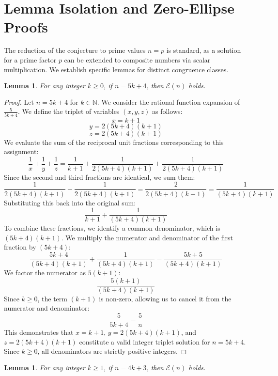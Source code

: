 \documentclass[12pt, a4paper]{article}
\newtheorem{lemma}[theorem]{Lemma}
\begin{document}
\section{Lemma Isolation and Zero-Ellipse Proofs}

The reduction of the conjecture to prime values $n = p$ is standard, as a solution for a prime factor $p$ can be extended to composite numbers via scalar multiplication. We establish specific lemmas for distinct congruence classes.

\begin{lemma}
For any integer $k \ge 0$, if $n = 5k + 4$, then $\mathcal{E}(n)$ holds.
\end{lemma}

\begin{proof}
Let $n = 5k + 4$ for $k \in \mathbb{N}$. We consider the rational function expansion of $\frac{5}{5k+4}$. We define the triplet of variables $(x, y, z)$ as follows:
\[ x = k + 1 \]
\[ y = 2(5k+4)(k+1) \]
\[ z = 2(5k+4)(k+1) \]
We evaluate the sum of the reciprocal unit fractions corresponding to this assignment:
\[ \frac{1}{x} + \frac{1}{y} + \frac{1}{z} = \frac{1}{k+1} + \frac{1}{2(5k+4)(k+1)} + \frac{1}{2(5k+4)(k+1)} \]
Since the second and third fractions are identical, we sum them:
\[ \frac{1}{2(5k+4)(k+1)} + \frac{1}{2(5k+4)(k+1)} = \frac{2}{2(5k+4)(k+1)} = \frac{1}{(5k+4)(k+1)} \]
Substituting this back into the original sum:
\[ \frac{1}{k+1} + \frac{1}{(5k+4)(k+1)} \]
To combine these fractions, we identify a common denominator, which is $(5k+4)(k+1)$. We multiply the numerator and denominator of the first fraction by $(5k+4)$:
\[ \frac{5k+4}{(5k+4)(k+1)} + \frac{1}{(5k+4)(k+1)} = \frac{5k+5}{(5k+4)(k+1)} \]
We factor the numerator as $5(k+1)$:
\[ \frac{5(k+1)}{(5k+4)(k+1)} \]
Since $k \ge 0$, the term $(k+1)$ is non-zero, allowing us to cancel it from the numerator and denominator:
\[ \frac{5}{5k+4} = \frac{5}{n} \]
This demonstrates that $x = k+1$, $y = 2(5k+4)(k+1)$, and $z = 2(5k+4)(k+1)$ constitute a valid integer triplet solution for $n = 5k+4$. Since $k \ge 0$, all denominators are strictly positive integers.
\end{proof}

\begin{lemma}
For any integer $k \ge 1$, if $n = 4k + 3$, then $\mathcal{E}(n)$ holds.
\end{lemma}
\end{document}
